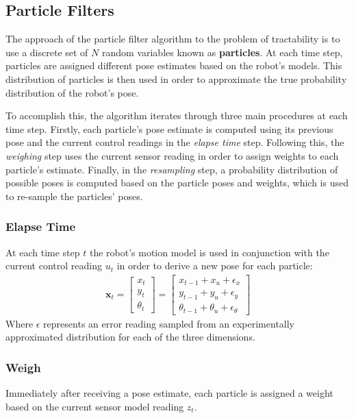 \documentclass[letterpaper, 12 pt, conference]{ieeeconf}  %
\begin{document}
\subsection{Particle Filters}

The approach of the particle filter algorithm to the problem of tractability is to use a discrete set of $N$ random variables known as \textbf{particles}. At each time step, particles are assigned different pose estimates based on the robot's models. This distribution of particles is then used in order to approximate the true probability distribution of the robot's pose. 
\par
To accomplish this, the algorithm iterates through three main procedures at each time step. Firstly, each particle's pose estimate is computed using its previous pose and the current control readings in the \textit{elapse time} step. Following this, the \textit{weighing} step uses the current sensor reading in order to assign weights to each particle's estimate. Finally, in the \textit{resampling} step, a probability distribution of possible poses is computed based on the particle poses and weights, which is used to re-sample the particles' poses. 

\subsubsection{Elapse Time}
At each time step $t$ the robot's motion model is used in conjunction with the current control reading $u_t$ in order to derive a new pose for each particle:
\begin{align*}
\textbf{x}_t = \begin{bmatrix}
				x_t \\
				y_t \\
				\theta _t
				\end{bmatrix} 
				=
				\begin{bmatrix}
				x_{t-1} + x_u + \epsilon _x\\
				y_{t-1} + y_u + \epsilon _y\\
				\theta _{t-1} + \theta _u + \epsilon _\theta				
				\end{bmatrix}
\end{align*}
Where $\epsilon$ represents an error reading sampled from an experimentally approximated distribution for each of the three dimensions. 
\subsubsection{Weigh}
Immediately after receiving a pose estimate, each particle is assigned a weight based on the current sensor model reading $z_t$.  
\end{document}
